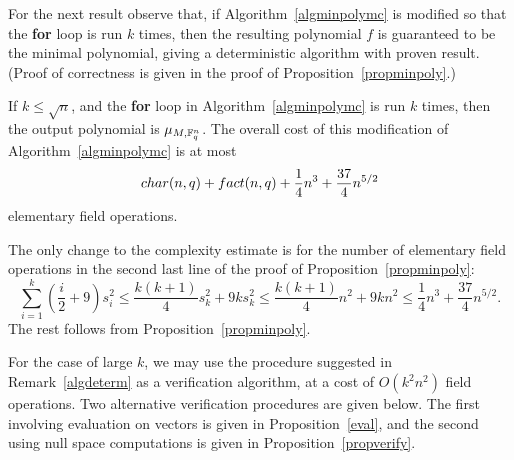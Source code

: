 For the next result observe that, if Algorithm~\ref{algminpolymc} 
is modified so that the {\bf for} loop is run $k$ times, then the resulting 
polynomial $f$ is guaranteed to be the minimal polynomial, giving a deterministic
algorithm with proven result. (Proof of correctness 
is given in the proof of Proposition~\ref{propminpoly}.)

\begin{Prop}
\label{veryfewvectors}

\mbox{}\par
If $k \le \sqrt{n}$,  and the {\bf for} loop in 
Algorithm~\ref{algminpolymc} is run $k$ times, then the output polynomial
is $\mu_{M,\mathbb{F}_q^n}$. The 
overall cost of this modification of Algorithm~\ref{algminpolymc} is at most
\[ {\rm char}(n,q) + {\rm fact}(n,q) + \frac{1}{4}n^3+\frac{37}{4} n^{5/2} \]
elementary field operations.
\end{Prop}
\proofbeg The only change 
to the complexity estimate is for the number of elementary field operations 
in the second last line of the proof of Proposition~\ref{propminpoly}:
\[
\sum_{i=1}^k(\frac{i}{2}+9)s_i^2 \leq \frac{k(k+1)}{4}s_k^2+9ks_k^2
\leq \frac{k(k+1)}{4}n^2+9kn^2\le \frac{1}{4}n^3+\frac{37}{4} n^{5/2}.
\]
The rest follows from Proposition~\ref{propminpoly}.
\proofend

\medskip
For the case of large $k$, we may use the procedure suggested in
Remark~\ref{algdeterm} as a verification algorithm, at a cost of
$O(k^2n^2)$ field operations. Two alternative verification procedures
are given below. The first involving evaluation on vectors is given in
Proposition~\ref{eval}, and the second using null space computations is
given in Proposition~\ref{propverify}.

